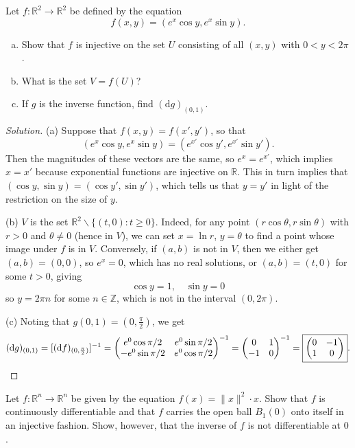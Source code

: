 \documentclass[10pt]{scrartcl}
\providecommand{\RR}{\mathbb R}
\providecommand{\ZZ}{\mathbb Z}
\providecommand{\ii}{\item}
\providecommand{\setdiff}{\smallsetminus}
\providecommand{\inv}{^{-1}}
\newenvironment{soln}{\begin{proof}[Solution]}{\end{proof}}
\begin{document}
\begin{problem}
	Let $f\colon\RR^2\to\RR^2$ be defined by the equation
	\[f(x,y) = (e^x\cos y, e^x\sin y).\]
	\begin{enumerate}[(a)]
		\ii Show that $f$ is injective on the set $U$ consisting of
		all $(x,y)$ with $0<y<2\pi$.
		\ii What is the set $V = f(U)$?
		\ii If $g$ is the inverse function, find $(\mathrm dg)_{(0,1)}$.
	\end{enumerate}
\end{problem}

\begin{soln}
	(a) Suppose that $f(x,y) = f(x',y')$, so that
	\[(e^x\cos y, e^x\sin y) = (e^{x'}\cos y', e^{x'}\sin y').\]
	Then the magnitudes of these vectors are the same, so
	$e^x = e^{x'}$, which implies $x=x'$ because exponential functions
	are injective on $\RR$. This in turn implies that
	$(\cos y,\sin y) = (\cos y', \sin y')$, which tells us that
	$y = y'$ in light of the restriction on the size of $y$.
	
	(b) $V$ is the set $\RR^2\setdiff\{(t,0):t\ge0\}$. Indeed, for any
	point $(r\cos\theta, r\sin\theta)$ with $r > 0$ and $\theta\ne 0$
	(hence in $V$), we can set $x = \ln r$, $y = \theta$ to find a point
	whose image under $f$ is in $V$. Conversely, if $(a, b)$ is not in $V$,
	then we either get $(a, b) = (0,0)$, so $e^x = 0$,
	which has no real solutions, or $(a, b) = (t, 0)$ for some $t > 0$, giving
	\[\cos y = 1,\quad \sin y = 0\]
	so $y = 2\pi n$ for some $n\in\ZZ$, which is not in the interval $(0,2\pi)$.
	
	(c) Noting that $g(0,1) = (0, \frac\pi2)$, we get
	\[(\mathrm dg)_{(0,1)} = [(\mathrm df)_{(0,\frac\pi2)}]\inv =
	\begin{pmatrix}
		e^0\cos\pi/2&e^0\sin\pi/2\\
		-e^0\sin\pi/2&e^0\cos\pi/2
	\end{pmatrix}\inv =\begin{pmatrix}
		0&1\\-1&0
	\end{pmatrix}\inv = \boxed{\begin{pmatrix}
		0&-1\\1&0
	\end{pmatrix}}.\qedhere\]
\end{soln}

\begin{problem}
	Let $f\colon\RR^n\to\RR^n$ be given by the equation $f(x) = \|x\|^2\cdot x$.
	Show that $f$ is continuously differentiable and that
	$f$ carries the open ball $B_1(0)$ onto itself in an injective fashion.
	Show, however, that the inverse of $f$ is not differentiable at $0$.
\end{problem}
\end{document}
